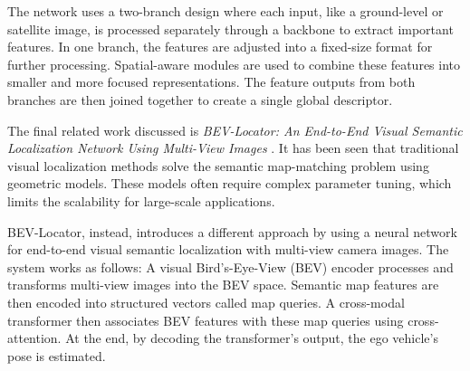 The network uses a two-branch design where each input, like a ground-level or satellite image, is processed separately through a backbone to extract important features. In one branch, the features are adjusted into a fixed-size format for further processing. Spatial-aware modules are used to combine these features into smaller and more focused representations. The feature outputs from both branches are then joined together to create a single global descriptor.

The final related work discussed is \textit{BEV-Locator: An End-to-End Visual Semantic Localization Network Using Multi-View Images} \cite{zhang2022bevlocatorendtoendvisualsemantic}. It has been seen that traditional visual localization methods solve the semantic map-matching problem using geometric models. These models often require complex parameter tuning, which limits the scalability for large-scale applications. 

BEV-Locator, instead, introduces a different approach by using a neural network for end-to-end visual semantic localization with multi-view camera images. The system works as follows: A visual Bird’s-Eye-View (BEV) encoder processes and transforms multi-view images into the BEV space. Semantic map features are then encoded into structured vectors called map queries. A cross-modal transformer then associates BEV features with these map queries using cross-attention. At the end, by decoding the transformer's output, the ego vehicle's pose is estimated. 

